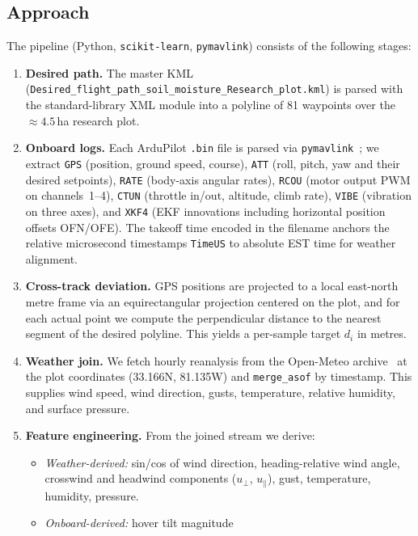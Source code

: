 \documentclass[sigconf, nonacm]{acmart}
\begin{document}
\subsection{Approach}
The pipeline (Python, \texttt{scikit-learn}, \texttt{pymavlink}) consists
of the following stages:
\begin{enumerate}[leftmargin=1.2em]
  \item \textbf{Desired path.}  The master KML
  (\texttt{Desired\_flight\_path\_soil\_moisture\_Research\_plot.kml}) is
  parsed with the standard-library XML module into a polyline of 81
  waypoints over the $\approx 4.5$\,ha research plot.
  \item \textbf{Onboard logs.}  Each ArduPilot \texttt{.bin} file is parsed
  via \texttt{pymavlink}~\cite{ardupilot}; we extract \texttt{GPS}
  (position, ground speed, course), \texttt{ATT} (roll, pitch, yaw and
  their desired setpoints), \texttt{RATE} (body-axis angular rates),
  \texttt{RCOU} (motor output PWM on channels~1--4), \texttt{CTUN} (throttle
  in/out, altitude, climb rate), \texttt{VIBE} (vibration on three axes),
  and \texttt{XKF4} (EKF innovations including horizontal position offsets
  OFN/OFE).  The takeoff time encoded in the filename anchors the
  relative microsecond timestamps \texttt{TimeUS} to absolute EST time for
  weather alignment.
  \item \textbf{Cross-track deviation.}  GPS positions are projected to a
  local east-north metre frame via an equirectangular projection centered
  on the plot, and for each actual point we compute the perpendicular
  distance to the nearest segment of the desired polyline.  This yields a
  per-sample target $d_i$ in metres.
  \item \textbf{Weather join.}  We fetch hourly reanalysis from the
  Open-Meteo archive~\cite{openmeteo} at the plot coordinates
  (33.166\textdegree{}N, 81.135\textdegree{}W) and
  \texttt{merge\_asof} by timestamp.  This supplies wind speed, wind
  direction, gusts, temperature, relative humidity, and surface pressure.
  \item \textbf{Feature engineering.}  From the joined stream we derive:
  \begin{itemize}[leftmargin=1.2em]
    \item \emph{Weather-derived:} sin/cos of wind direction,
    heading-relative wind angle, crosswind and headwind components
    ($u_\perp$, $u_\parallel$), gust, temperature, humidity, pressure.
    \item \emph{Onboard-derived:} hover tilt magnitude

\end{itemize}
\end{enumerate}
\end{document}

